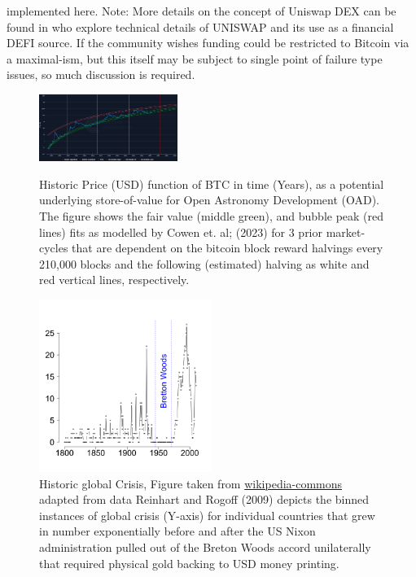 \documentclass[final,5p,times,twocolumn,authoryear]{elsarticle}
\begin{document}
implemented here. Note:  More details on the concept of Uniswap DEX can be found in \cite{uniswap2019_angeris} who explore technical details of UNISWAP and its use as a financial DEFI source. If the community wishes funding could be restricted to Bitcoin via a maximal-ism, but this itself may be subject to single point of failure type issues, so much discussion is required.  

 \begin{figure}[ht!]
  \centering
  \caption{Historic Price (USD) function of BTC in time (Years), as a potential underlying store-of-value for Open Astronomy Development (OAD). The figure shows the fair value (middle green), and bubble peak (red lines) fits as modelled by Cowen et. al; (2023) for 3 prior market-cycles that are dependent on the bitcoin block reward halvings every 210,000 blocks and the following (estimated) halving as white and red vertical lines, respectively.}
  \includegraphics[width=0.4\textwidth]{figs/cowen3.png}
  \label{fig:cowen}
  \end{figure}

\begin{figure}[h!]
    \centering
  \caption{Historic global Crisis, Figure taken from \href{https://en.wikipedia.org/wiki/Global_recession}{wikipedia-commons} adapted from data Reinhart and Rogoff (2009) depicts the binned instances of global crisis (Y-axis) for individual countries that grew in number exponentially before and after the US Nixon administration pulled out of the Breton Woods accord unilaterally that required physical gold backing to USD money printing.}
  \label{fig:crisis}
  \includegraphics[width=0.5\textwidth]{figs/330px-BankingCrises.svg.png}
\end{figure}
\end{document}
